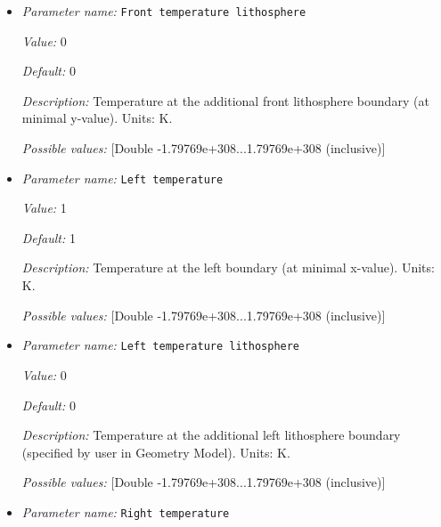 \begin{itemize}
{\it Default:} 0


{\it Description:} Temperature at the front boundary (at minimal y-value). Units: K.


{\it Possible values:} [Double -1.79769e+308...1.79769e+308 (inclusive)]
\item {\it Parameter name:} {\tt Front temperature lithosphere}
\label{parameters:Boundary temperature model/Box with lithosphere boundary indicators/Front temperature lithosphere}


{\it Value:} 0


{\it Default:} 0


{\it Description:} Temperature at the additional front lithosphere boundary (at minimal y-value). Units: K.


{\it Possible values:} [Double -1.79769e+308...1.79769e+308 (inclusive)]
\item {\it Parameter name:} {\tt Left temperature}
\label{parameters:Boundary temperature model/Box with lithosphere boundary indicators/Left temperature}


{\it Value:} 1


{\it Default:} 1


{\it Description:} Temperature at the left boundary (at minimal x-value). Units: K.


{\it Possible values:} [Double -1.79769e+308...1.79769e+308 (inclusive)]
\item {\it Parameter name:} {\tt Left temperature lithosphere}
\label{parameters:Boundary temperature model/Box with lithosphere boundary indicators/Left temperature lithosphere}


{\it Value:} 0


{\it Default:} 0


{\it Description:} Temperature at the additional left lithosphere boundary (specified by user in Geometry Model). Units: K.


{\it Possible values:} [Double -1.79769e+308...1.79769e+308 (inclusive)]
\item {\it Parameter name:} {\tt Right temperature}
\label{parameters:Boundary temperature model/Box with lithosphere boundary indicators/Right temperature}



\end{itemize}
